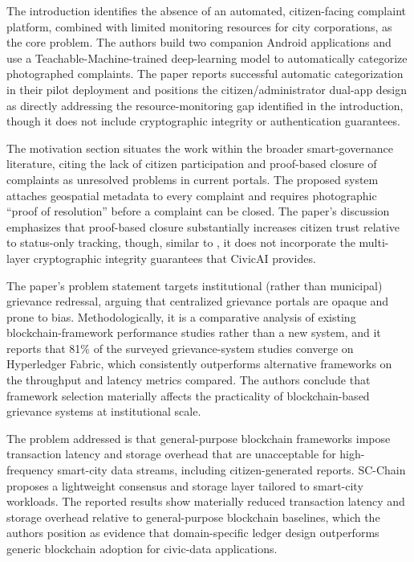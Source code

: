\documentclass[conference]{IEEEtran}
\begin{document}
\cite{l13citysolution} The introduction identifies the absence of an automated, citizen-facing complaint platform, combined with limited monitoring resources for city corporations, as the core problem. The authors build two companion Android applications and use a Teachable-Machine-trained deep-learning model to automatically categorize photographed complaints. The paper reports successful automatic categorization in their pilot deployment and positions the citizen/administrator dual-app design as directly addressing the resource-monitoring gap identified in the introduction, though it does not include cryptographic integrity or authentication guarantees.

\cite{l14civicconnect} The motivation section situates the work within the broader smart-governance literature, citing the lack of citizen participation and proof-based closure of complaints as unresolved problems in current portals. The proposed system attaches geospatial metadata to every complaint and requires photographic ``proof of resolution'' before a complaint can be closed. The paper's discussion emphasizes that proof-based closure substantially increases citizen trust relative to status-only tracking, though, similar to \cite{l13citysolution}, it does not incorporate the multi-layer cryptographic integrity guarantees that CivicAI provides.

\cite{l15grievanceblockchain} The paper's problem statement targets institutional (rather than municipal) grievance redressal, arguing that centralized grievance portals are opaque and prone to bias. Methodologically, it is a comparative analysis of existing blockchain-framework performance studies rather than a new system, and it reports that 81\% of the surveyed grievance-system studies converge on Hyperledger Fabric, which consistently outperforms alternative frameworks on the throughput and latency metrics compared. The authors conclude that framework selection materially affects the practicality of blockchain-based grievance systems at institutional scale.

\cite{l16scchain} The problem addressed is that general-purpose blockchain frameworks impose transaction latency and storage overhead that are unacceptable for high-frequency smart-city data streams, including citizen-generated reports. SC-Chain proposes a lightweight consensus and storage layer tailored to smart-city workloads. The reported results show materially reduced transaction latency and storage overhead relative to general-purpose blockchain baselines, which the authors position as evidence that domain-specific ledger design outperforms generic blockchain adoption for civic-data applications.
\end{document}
